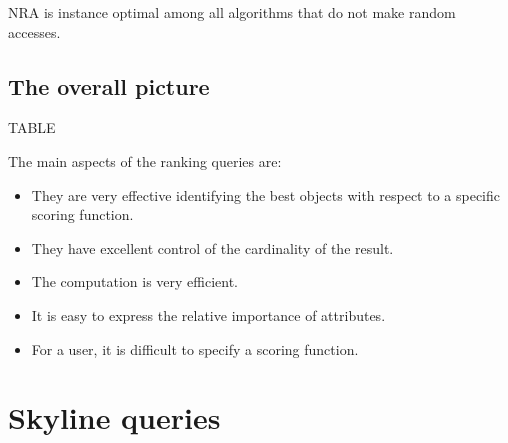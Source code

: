 \documentclass[12pt, a4paper]{report}
\newtheorem[style=M,bodystyle=\normalfont]{theorem}{Theorem}
\newtheorem[style=M,bodystyle=\normalfont]{corollary}{Corollary}
\newtheorem[style=M,bodystyle=\normalfont]{lemma}{Lemma}
\newtheorem[style=M,bodystyle=\normalfont]{definition}{Definition}
\begin{document}
    NRA is instance optimal among all algorithms that do not make random accesses.
    
    \subsection{The overall picture}
    TABLE 

    The main aspects of the ranking queries are: 
    \begin{itemize}
        \item They are very effective identifying the best objects with respect to a specific scoring function. 
        \item They have excellent control of the cardinality of the result. 
        \item The computation is very efficient. 
        \item It is easy to express the relative importance of attributes. 
        \item For a user, it is difficult to specify a scoring function. 
    \end{itemize}

    \section{Skyline queries}
\end{document}

